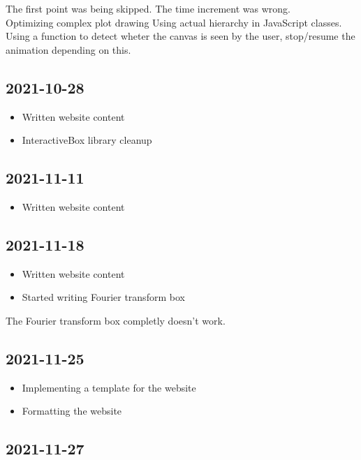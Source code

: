 \documentclass{article}
\begin{document}
The first point was being skipped. The time increment was wrong.
\\
Optimizing complex plot drawing
Using actual hierarchy in JavaScript classes.
Using a function to detect wheter the canvas is seen by the user,
stop/resume the animation depending on this.

\subsection*{2021-10-28}

\begin{itemize}
    \item Written website content
    \item InteractiveBox library cleanup
\end{itemize}

\subsection*{2021-11-11}

\begin{itemize}
    \item Written website content
\end{itemize}

\subsection*{2021-11-18}

\begin{itemize}
    \item Written website content
    \item Started writing Fourier transform box
\end{itemize}

The Fourier transform box completly doesn't work.

\subsection*{2021-11-25}

\begin{itemize}
    \item Implementing a template for the website
    \item Formatting the website
\end{itemize}

\subsection*{2021-11-27}
\end{document}
